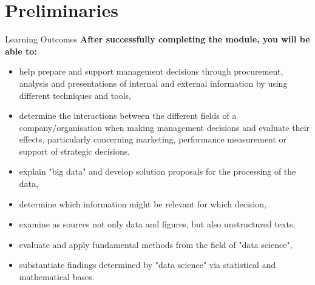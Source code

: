 \documentclass[document.tex]{subfiles}
\begin{document}
    
    \section{Preliminaries}
    
    \iffom 
    \begin{frame}{Learning Outcomes}
        \textbf{After successfully completing the module, you will be able to:}
        \begin{itemize}
            \item help prepare and support management decisions through procurement, analysis and presentations of internal and external information by using different techniques and tools,
            \item determine the interactions between the different fields of a company/organisation when making management decisions and evaluate their effects, particularly concerning marketing, performance measurement or support of strategic decisions,
            \item explain "big data" and develop solution proposals for the processing of the data,
            \item determine which information might be relevant for which decision,
            \item examine as sources not only data and figures, but also unstructured texts,
            \item evaluate and apply fundamental methods from the field of "data science",
            \item substantiate findings determined by "data science" via statistical and mathematical bases.
        \end{itemize}
    \end{frame}
	
\end{document}
